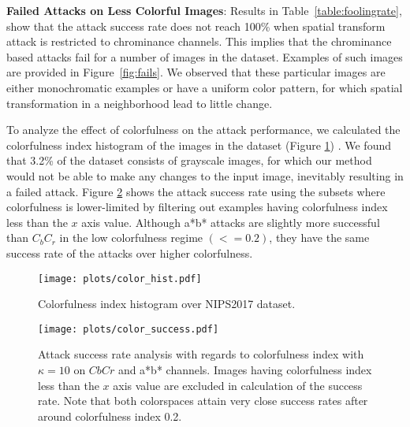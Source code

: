\textbf{Failed Attacks on Less Colorful Images}: Results in Table~\ref{table:foolingrate}, show that the attack success rate does not reach 100\% when spatial transform attack is restricted to chrominance channels.  %
This implies that the chrominance based attacks fail for a number of images in the dataset. Examples of such images are provided in Figure~\ref{fig:fails}. We observed that these  particular images are either monochromatic examples or have a uniform color pattern, for which spatial transformation in a neighborhood lead to little change.

To analyze the effect of colorfulness on the attack performance, we calculated the colorfulness index histogram of the images in the dataset (Figure \ref{fig:hist}) . We found that 3.2\% of the dataset consists of grayscale images, for which our method would not be able to make any changes to the input image, inevitably resulting in a failed attack. Figure \ref{fig:plots} shows the attack success rate using the subsets where colorfulness is lower-limited by filtering out examples having colorfulness index less than the \(x\) axis value. Although a*b* attacks are slightly more successful than \(C_bC_r\) in the low colorfulness regime \((<=0.2)\), they have the same success rate of the attacks over higher colorfulness.


\begin{figure}[t]

    \begin{center}
        \texttt{[image: plots/color\_hist.pdf]}
    \end{center}
    \caption{Colorfulness index histogram over NIPS2017 dataset.}\label{fig:hist}
\end{figure}
\begin{figure}[t]
    \begin{center}
        \texttt{[image: plots/color\_success.pdf]}
    \end{center}
    \caption{Attack success rate analysis with regards to colorfulness index with \(\kappa=10\) on \(CbCr\) and a*b* channels. Images having colorfulness index less than the \(x\) axis value are excluded in calculation of the success rate. Note that both colorspaces attain very close success rates after around colorfulness index 0.2.} \label{fig:plots}
\end{figure}

